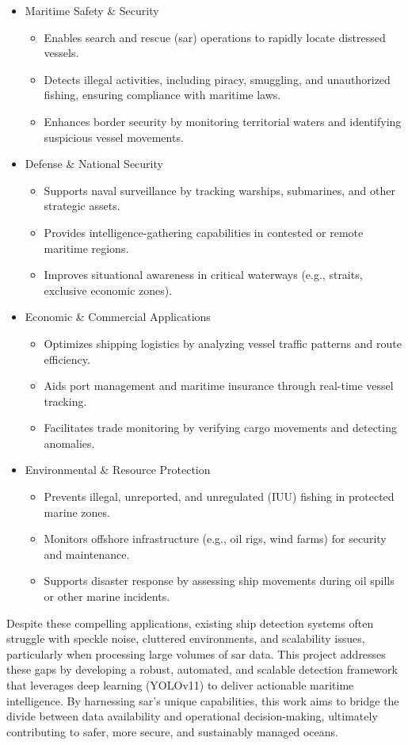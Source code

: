 \documentclass{article}
\begin{document}
	\begin{itemize}
		\item Maritime Safety \& Security
		\begin{itemize}
			\item Enables search and rescue (\acrshort{sar}) operations to rapidly locate distressed vessels. \item Detects illegal activities, including piracy, smuggling, and unauthorized fishing, ensuring compliance with maritime laws. \item Enhances border security by monitoring territorial waters and identifying suspicious vessel movements. \end{itemize}
		\item Defense \& National Security
		\begin{itemize}
			\item Supports naval surveillance by tracking warships, submarines, and other strategic assets. \item Provides intelligence-gathering capabilities in contested or remote maritime regions. \item Improves situational awareness in critical waterways (e.g., straits, exclusive economic zones). \end{itemize}
		\item Economic \& Commercial Applications
		\begin{itemize}
			\item Optimizes shipping logistics by analyzing vessel traffic patterns and route efficiency. \item Aids port management and maritime insurance through real-time vessel tracking. \item Facilitates trade monitoring by verifying cargo movements and detecting anomalies. \end{itemize}
		\item Environmental \& Resource Protection
		\begin{itemize}
			\item Prevents illegal, unreported, and unregulated (IUU) fishing in protected marine zones. \item Monitors offshore infrastructure (e.g., oil rigs, wind farms) for security and maintenance. \item Supports disaster response by assessing ship movements during oil spills or other marine incidents. \end{itemize}
	\end{itemize}
	Despite these compelling applications, existing ship detection systems often struggle with speckle noise, cluttered environments, and scalability issues, particularly when processing large volumes of \acrshort{sar} data. This project addresses these gaps by developing a robust, automated, and scalable detection framework that leverages deep learning (YOLOv11) to deliver actionable maritime intelligence. By harnessing \acrshort{sar}’s unique capabilities, this work aims to bridge the divide between data availability and operational decision-making, ultimately contributing to safer, more secure, and sustainably managed oceans.
	
\end{document}
